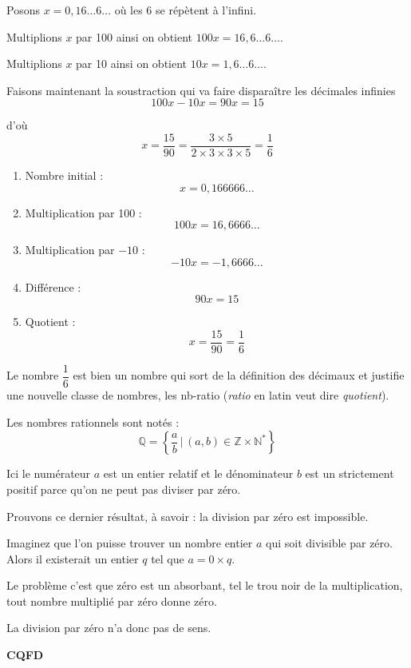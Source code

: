 \documentclass[a4paper,11pt]{book}
\begin{document}
Posons \(x = 0,16\dots 6\dots\) où les 6 se répètent à
l'infini.

Multiplions \(x\) par 100 ainsi on obtient \(100x = 16,6\dots
6\dots\).

Multiplions \(x\) par 10 ainsi on obtient \(10x = 1,6\dots 6\dots\).

Faisons maintenant la soustraction qui va faire disparaître les
décimales infinies  \[100x - 10x = 90x = 15\]

d'où \[x = \dfrac{15}{90} = \dfrac{3\times 5}{2\times 3\times 3\times 5} =
\dfrac{1}{6}\]

\begin{enumerate}
\item Nombre initial :
\[x = 0,166666\dots\]
\item Multiplication par 100 :
\[100x = 16,6666\dots\]
\item Multiplication par \(-10\) :
\[-10x = -1,6666\dots\]
\item Différence :
\[90x = 15\]
\item Quotient :
\[x = \dfrac{15}{90} = \dfrac{1}{6}\]
\end{enumerate}



Le nombre \(\dfrac{1}{6}\) est bien un nombre qui sort de la
définition des décimaux et justifie une nouvelle
classe de nombres, les \gls{nb-ratio}
(\emph{ratio} en latin veut dire \emph{quotient}).


Les nombres rationnels sont notés : 
\[\mathbb{Q} = \left\{\dfrac{a}{b}\,|\,(a,
b)\in\mathbb{Z}\times\mathbb{N}^*\right\}\]

Ici le numérateur \(a\) est un entier relatif et
le dénominateur \(b\) est un  strictement
positif parce qu'on ne peut pas diviser par zéro.

Prouvons ce dernier résultat, à savoir : la division par zéro est
impossible. 

Imaginez que l'on puisse trouver un nombre entier \(a\) qui soit
divisible par zéro.
Alors il existerait un entier \(q\) tel que \(a = 0\times q\).

Le problème c'est que zéro est un \gls{absorbant},
tel le trou noir de la multiplication, tout nombre multiplié par zéro
donne zéro.


La division par zéro n'a donc pas de sens.

\textbf{CQFD}
\end{document}
